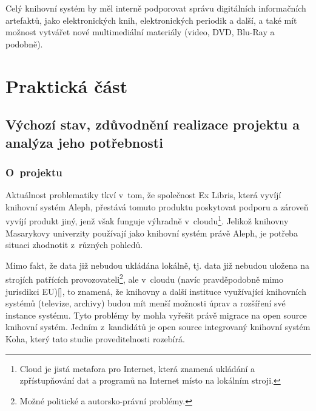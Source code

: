 \documentclass[
	11pt, oneside, printed, draft, 
	table,   %
	lof,     %
	lot     %
]{fithesis3}
\newcommand{\citepages}[2]{[\cite[#1]{#2}]}
\begin{document}
{Celý knihovní systém by měl interně podporovat správu digitálních informačních artefaktů, jako  elektronických knih, elektronických periodik a další, a také mít možnost vytvářet nové multimediální materiály (video, DVD, Blu-Ray a podobně).

\chapter{Praktická část}

\section{Výchozí stav, zdůvodnění realizace projektu a analýza jeho potřebnosti}

\subsection{O~projektu}

Aktuálnost problematiky tkví v~tom, že společnost Ex Libris, která vyvíjí knihovní systém Aleph, přestává tomuto produktu poskytovat podporu a zároveň vyvíjí produkt jiný, jenž však funguje výhradně v~cloudu\footnote{Cloud je jistá metafora pro Internet, která znamená ukládání a zpřístupňování dat a programů na Internet místo na lokálním stroji.}. Jelikož knihovny Masarykovy univerzity používají jako knihovní systém právě Aleph, je potřeba situaci zhodnotit z~různých pohledů.

Mimo fakt, že data již nebudou ukládána lokálně, tj. data již nebudou uložena na strojích patřících provozovateli\footnote{Možné politické a autorsko-právní problémy.}, ale v~cloudu (navíc pravděpodobně mimo jurisdikci EU)\citepages{16-17}{breeding_2012}, to znamená, že knihovny a další instituce využívající knihovních systémů (televize, archivy) budou mít menší možnosti úprav a rozšíření své instance systému. Tyto problémy by mohla vyřešit právě migrace na open source knihovní systém. Jedním z~kandidátů je open source integrovaný knihovní systém Koha, který tato studie proveditelnosti rozebírá. 

}
\end{document}

